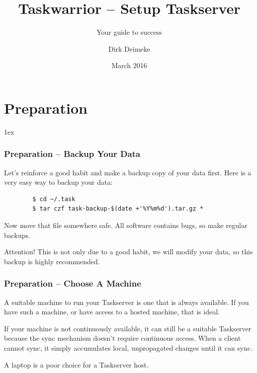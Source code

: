 \documentclass[t,handout]{beamer}
\title{Taskwarrior -- Setup Taskserver}
\subtitle{Your guide to success}
\author[Deimeke, Dirk]{Dirk Deimeke}
\institute[Taskwarrior Academy]{Taskwarrior Academy}
\date{March 2016}
\begin{document}



\section{Preparation}

\parskip1ex

\begin{frame}[fragile]\frametitle{Preparation -- Backup Your Data}\label{backup}

    Let's reinforce a good habit and make a backup copy of your data first. Here is a very easy way to backup your data:

    \begin{lstlisting}
        $ cd ~/.task
        $ tar czf task-backup-$(date +'%Y%m%d').tar.gz *
    \end{lstlisting}

    Now move that file somewhere safe. All software contains bugs, so make regular backups.

	\begin{alertblock}{Attention!}
		This is not only due to a good habit, we will modify your data, so this backup is highly recommended.
	\end{alertblock}

\end{frame}

\begin{frame}[fragile]\frametitle{Preparation -- Choose A  Machine}

	A suitable machine to run your Taskserver is one that is always available. If you have such a machine, or have access to a hosted machine, that is ideal.

	If your machine is not continuously available, it can still be a suitable Taskserver because the sync mechanism doesn't require continuous access. When a client cannot sync, it simply accumulates local, unpropagated changes until it can sync.

	A laptop is a poor choice for a Taskserver host.

\end{frame}
\end{document}
